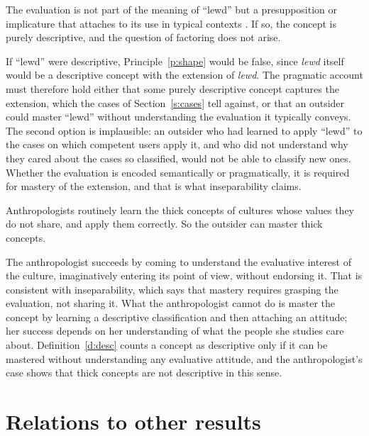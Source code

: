 \documentclass{situationist-preprint}
\begin{document}
\begin{objection}
The evaluation is not part of the meaning of \enquote{lewd} but a presupposition or implicature that attaches to its use in typical contexts \citep{Vayrynen2013}. If so, the concept is purely descriptive, and the question of factoring does not arise.
\end{objection}

\begin{reply}
If \enquote{lewd} were descriptive, Principle~\ref{p:shape} would be false, since \emph{lewd} itself would be a descriptive concept with the extension of \emph{lewd}. The pragmatic account must therefore hold either that some purely descriptive concept captures the extension, which the cases of Section~\ref{s:cases} tell against, or that an outsider could master \enquote{lewd} without understanding the evaluation it typically conveys. The second option is implausible: an outsider who had learned to apply \enquote{lewd} to the cases on which competent users apply it, and who did not understand why they cared about the cases so classified, would not be able to classify new ones. Whether the evaluation is encoded semantically or pragmatically, it is required for mastery of the extension, and that is what inseparability claims.
\end{reply}

\begin{objection}[Anthropologists]
Anthropologists routinely learn the thick concepts of cultures whose values they do not share, and apply them correctly. So the outsider can master thick concepts.
\end{objection}

\begin{reply}
The anthropologist succeeds by coming to understand the evaluative interest of the culture, imaginatively entering its point of view, without endorsing it. That is consistent with inseparability, which says that mastery requires grasping the evaluation, not sharing it. What the anthropologist cannot do is master the concept by learning a descriptive classification and then attaching an attitude; her success depends on her understanding of what the people she studies care about. Definition~\ref{d:desc} counts a concept as descriptive only if it can be mastered without understanding any evaluative attitude, and the anthropologist's case shows that thick concepts are not descriptive in this sense.
\end{reply}

\section{Relations to other results}
\end{document}
